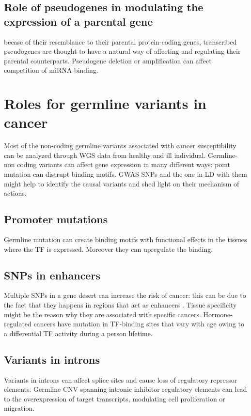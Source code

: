 	\subsection{Role of pseudogenes in modulating the expression of a parental gene}
	becase of their resemblance to their parental protein-coding genes, transcribed pseudogenes are thought to have a natural way of affecting and regulating their parental counterparts.
	Pseudogene deletion or amplification can affect competition of miRNA binding.

\section{Roles for germline variants in cancer}
Most of the non-coding germline variants associated with cancer susceptibility can be analyzed through WGS data from healthy and ill individual.
Germline-non coding variants can affect gene expression in many different ways: point mutation can distrupt binding motifs.
GWAS SNPs and the one in LD with them might help to identify the causal variants and shed light on their mechanism of actions.

	\subsection{Promoter mutations}
	Germline mutation can create binding motifs with functional effects in the tissues where the TF is expressed.
	Moreover they can upregulate the binding.

	\subsection{SNPs in enhancers}
	Multiple SNPs in a gene desert can increase the risk of cancer: this can be due to the fact that they happens in regions that act as enhancers .
	Tissue specificity might be the reason why they are associated with specific cancers.
	Hormone-regulated cancers have mutation in TF-binding sites that vary with age owing to a differential TF activity during a person lifetime.

	\subsection{Variants in introns}
	Variants in introns can affect splice sites and cause loss of regulatory repressor elements.
	Germline CNV spanning intronic inhibitor regulatory elements can lead to the overexpression of target transcripts, modulating cell proliferation or migration.

